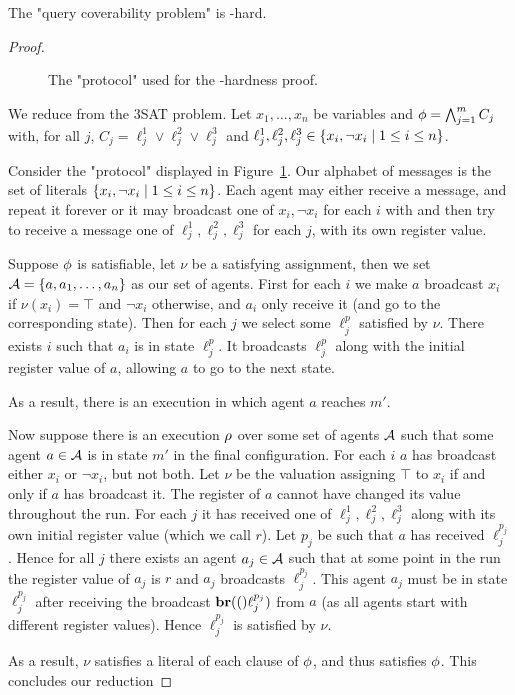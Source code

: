 \begin{proposition}
	The "query coverability problem" is \np-hard.
\end{proposition}

\begin{proof}
	\begin{figure}[h]
		
		\label{fig:np-hard}
		\caption{The "protocol" used for the \np-hardness proof.}
	\end{figure}
	
	We reduce from the 3SAT problem.
	Let $x_1, \ldots, x_n$ be variables and $\phi = \bigwedge_{j=1}^m C_j$ with, for all $j$, $C_j = \ell_j^1 \lor \ell_j^2 \lor \ell_j^3$ and $\ell_j^1, \ell_j^2, \ell_j^3 \in \{x_i, \neg x_i \mid 1 \leq i \leq n\}$. 

	Consider the "protocol" displayed in Figure~\ref{fig:np-hard}.
	Our alphabet of messages is the set of literals $\{x_i, \neg x_i \mid 1 \leq i \leq n\}$.
	Each agent may either receive a message, and repeat it forever or it may broadcast one of $x_i, \neg x_i$ for each $i$ with and then try to receive a message one of $\ell_j^1, \ell_j^2, \ell_j^3$ for each $j$, with its own register value.
	
	Suppose $\phi$ is satisfiable, let $\nu$ be a satisfying assignment, then we set $\mathcal{A} = \{a, a_1, \ldots, a_n\}$ as our set of agents. First for each $i$ we make $a$ broadcast $x_i$ if $\nu(x_i)= \top$ and $\neg x_i$ otherwise, and $a_i$ only receive it (and go to the corresponding state).
	Then for each $j$ we select some $\ell_j^p$ satisfied by $\nu$. There exists $i$ such that $a_i$ is in state $\ell_j^p$. It broadcasts $\ell_j^p$ along with the initial register value of $a$, allowing $a$ to go to the next state.
	
	As a result, there is an execution in which agent $a$ reaches $m'$.
	
	Now suppose there is an execution $\rho$ over some set of agents $\mathcal{A}$ such that some agent $a \in \mathcal{A}$ is in state $m'$ in the final configuration.
	For each $i$ $a$ has broadcast either $x_i$ or $\neg x_i$, but not both.
	Let $\nu$ be the valuation assigning $\top$ to $x_i$ if and only if $a$ has broadcast it.
	The register of $a$ cannot have changed its value throughout the run. 
	For each $j$ it has received one of $\ell_j^1, \ell_j^2, \ell_j^3$ along with its own initial register value (which we call $r$). Let $p_j$ be such that $a$ has received $\ell_j^{p_j}$.
	Hence for all $j$ there exists an agent $a_j \in \mathcal{A}$ such that at some point in the run the register value of $a_j$ is $r$ and $a_j$ broadcasts $\ell_j^{p_j}$.
	This agent $a_j$ must be in state $\ell_j^{p_j}$ after receiving the broadcast $\textbf{br}(()\ell_j^{p_j})$  from $a$ (as all agents start with different register values).
	Hence $\ell_j^{p_j}$ is satisfied by $\nu$. 
	
	As a result, $\nu$ satisfies a literal of each clause of $\phi$, and thus satisfies $\phi$. This concludes our reduction
\end{proof}
